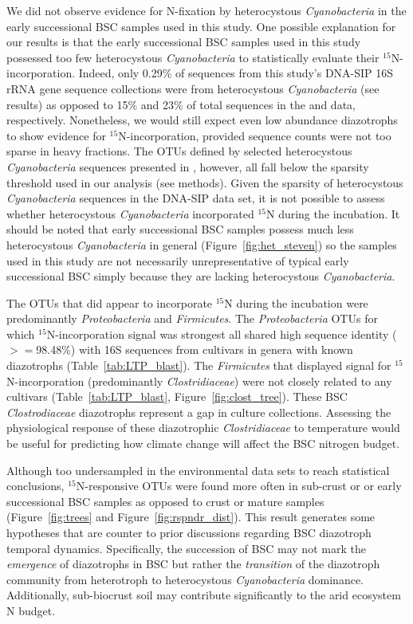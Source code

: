 We did not observe evidence for N-fixation by heterocystous
\textit{Cyanobacteria} in the early successional BSC samples used in this
study. One possible explanation for our results is that the early successional
BSC samples used in this study possessed too few heterocystous
\textit{Cyanobacteria} to statistically evaluate their $^{15}$N-incorporation.
Indeed, only 0.29\% of sequences from this study's DNA-SIP 16S rRNA gene
sequence collections were from heterocystous \textit{Cyanobacteria} (see results)
as opposed to 15\% and 23\% of total sequences in the \citet{Steven_2013} and
\citet{Garcia_Pichel_2013} data, respectively.  Nonetheless, we would still
expect even low abundance diazotrophs to show evidence for
$^{15}$N-incorporation, provided sequence counts were not too sparse in heavy
fractions. The OTUs defined by selected heterocystous \textit{Cyanobacteria}
sequences presented in \citet{Yeager}, however, all fall below the sparsity
threshold used in our analysis (see methods). Given the sparsity of
heterocystous \textit{Cyanobacteria} sequences in the DNA-SIP data set, it is
not possible to assess whether heterocystous \textit{Cyanobacteria}
incorporated $^{15}$N during the incubation. It should be noted that 
early successional BSC samples possess much less heterocystous
\textit{Cyanobacteria} in general (Figure~\ref{fig:het_steven}) so the samples
used in this study are not necessarily unrepresentative of typical early
successional BSC simply because they are lacking heterocystous
\textit{Cyanobacteria}. 

The OTUs that did appear to incorporate $^{15}$N during the incubation were
predominantly \textit{Proteobacteria} and \textit{Firmicutes}. The
\textit{Proteobacteria} OTUs for which $^{15}$N-incorporation signal was
strongest all shared high sequence identity ($>=$98.48\%) with 16S sequences
from cultivars in genera with known diazotrophs (Table~\ref{tab:LTP_blast}).
The \textit{Firmicutes} that displayed signal for $^{15}$N-incorporation
(predominantly \textit{Clostridiaceae}) were not closely related to any
cultivars (Table~\ref{tab:LTP_blast}, Figure~\ref{fig:clost_tree}). These BSC
\textit{Clostrodiaceae} diazotrophs represent a gap in culture collections.
Assessing the physiological response of these diazotrophic
\textit{Clostridiaceae} to temperature would be useful for predicting how
climate change will affect the BSC nitrogen budget.

Although too undersampled in the environmental data sets to reach statistical
conclusions, $^{15}$N-responsive OTUs were found more often in sub-crust or or
early successional BSC samples as opposed to crust or mature samples
(Figure~\ref{fig:trees} and Figure~\ref{fig:rspndr_dist}).  This result
generates some hypotheses that are counter to prior discussions regarding BSC
diazotroph temporal dynamics.  Specifically, the succession of BSC may not mark
the \textit{emergence} of diazotrophs in BSC but rather the \textit{transition}
of the diazotroph community from heterotroph to heterocystous
\textit{Cyanobacteria} dominance.  Additionally, sub-biocrust soil may
contribute significantly to the arid ecosystem N budget.

